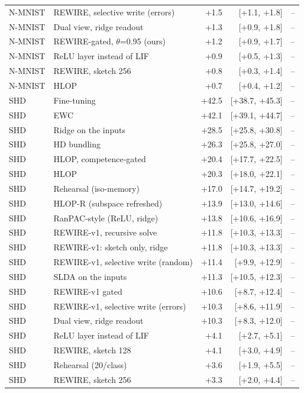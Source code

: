 \begin{tabular}{llrrr}
N-MNIST & REWIRE, selective write (errors) & +1.5 & [+1.1, +1.8] & -- \\
N-MNIST & Dual view, ridge readout & +1.3 & [+0.9, +1.8] & -- \\
N-MNIST & REWIRE-gated, $\theta$=0.95 (ours) & +1.2 & [+0.9, +1.7] & -- \\
N-MNIST & ReLU layer instead of LIF & +0.9 & [+0.5, +1.3] & -- \\
N-MNIST & REWIRE, sketch 256 & +0.8 & [+0.3, +1.4] & -- \\
N-MNIST & HLOP & +0.7 & [+0.4, +1.2] & -- \\
SHD & Fine-tuning & +42.5 & [+38.7, +45.3] & -- \\
SHD & EWC & +42.1 & [+39.1, +44.7] & -- \\
SHD & Ridge on the inputs & +28.5 & [+25.8, +30.8] & -- \\
SHD & HD bundling & +26.3 & [+25.8, +27.0] & -- \\
SHD & HLOP, competence-gated & +20.4 & [+17.7, +22.5] & -- \\
SHD & HLOP & +20.3 & [+18.0, +22.1] & -- \\
SHD & Rehearsal (iso-memory) & +17.0 & [+14.7, +19.2] & -- \\
SHD & HLOP-R (subspace refreshed) & +13.9 & [+13.0, +14.6] & -- \\
SHD & RanPAC-style (ReLU, ridge) & +13.8 & [+10.6, +16.9] & -- \\
SHD & REWIRE-v1, recursive solve & +11.8 & [+10.3, +13.3] & -- \\
SHD & REWIRE-v1: sketch only, ridge & +11.8 & [+10.3, +13.3] & -- \\
SHD & REWIRE-v1, selective write (random) & +11.4 & [+9.9, +12.9] & -- \\
SHD & SLDA on the inputs & +11.3 & [+10.5, +12.3] & -- \\
SHD & REWIRE-v1 gated & +10.6 & [+8.7, +12.4] & -- \\
SHD & REWIRE-v1, selective write (errors) & +10.3 & [+8.6, +11.9] & -- \\
SHD & Dual view, ridge readout & +10.3 & [+8.3, +12.0] & -- \\
SHD & ReLU layer instead of LIF & +4.1 & [+2.7, +5.1] & -- \\
SHD & REWIRE, sketch 128 & +4.1 & [+3.0, +4.9] & -- \\
SHD & Rehearsal (20/class) & +3.6 & [+1.9, +5.5] & -- \\
SHD & REWIRE, sketch 256 & +3.3 & [+2.0, +4.4] & -- \\

\end{tabular}
